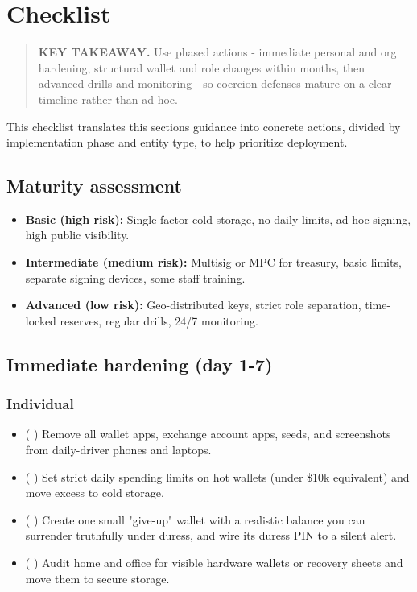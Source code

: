 \chapter{Checklist}\label{checklist}

\begin{quote}
\textbf{KEY TAKEAWAY.} Use phased actions - immediate personal and org hardening, structural wallet and role changes within months, then advanced drills and monitoring - so coercion defenses mature on a clear timeline rather than ad hoc.
\end{quote}

This checklist translates this section\textquotesingle s guidance into concrete actions, divided by implementation phase and entity type, to help prioritize deployment.

\section{Maturity assessment}\label{maturity-assessment}

\begin{itemize}
\tightlist
\item
  \textbf{Basic (high risk):} Single-factor cold storage, no daily limits, ad-hoc signing, high public visibility.
\item
  \textbf{Intermediate (medium risk):} Multisig or MPC for treasury, basic limits, separate signing devices, some staff training.
\item
  \textbf{Advanced (low risk):} Geo-distributed keys, strict role separation, time-locked reserves, regular drills, 24/7 monitoring.
\end{itemize}

\section{Immediate hardening (day 1-7)}\label{immediate-hardening-day-1-7}

\subsection{Individual}\label{individual}

\begin{itemize}
\tightlist
\item
  ( ) Remove all wallet apps, exchange account apps, seeds, and screenshots from daily-driver phones and laptops.
\item
  ( ) Set strict daily spending limits on hot wallets (under \$10k equivalent) and move excess to cold storage.
\item
  ( ) Create one small "give-up" wallet with a realistic balance you can surrender truthfully under duress, and wire its duress PIN to a silent alert.
\item
  ( ) Audit home and office for visible hardware wallets or recovery sheets and move them to secure storage.
\end{itemize}

